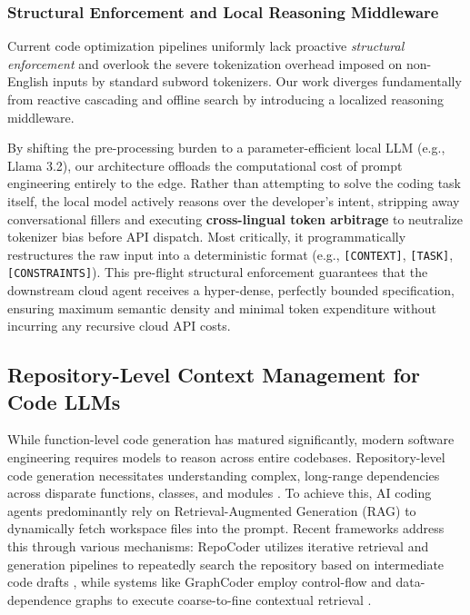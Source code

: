 \documentclass[11pt,a4paper,twocolumn]{article}
\begin{document}
\subsubsection*{Structural Enforcement and Local Reasoning Middleware}

Current code optimization pipelines uniformly lack proactive \textit{structural enforcement} and overlook the severe tokenization overhead imposed on non-English inputs by standard subword tokenizers. Our work diverges fundamentally from reactive cascading and offline search by introducing a localized reasoning middleware. 

By shifting the pre-processing burden to a parameter-efficient local LLM (e.g., Llama 3.2), our architecture offloads the computational cost of prompt engineering entirely to the edge. Rather than attempting to solve the coding task itself, the local model actively reasons over the developer's intent, stripping away conversational fillers and executing \textbf{cross-lingual token arbitrage} to neutralize tokenizer bias before API dispatch. Most critically, it programmatically restructures the raw input into a deterministic format (e.g., \texttt{[CONTEXT]}, \texttt{[TASK]}, \texttt{[CONSTRAINTS]}). This pre-flight structural enforcement guarantees that the downstream cloud agent receives a hyper-dense, perfectly bounded specification, ensuring maximum semantic density and minimal token expenditure without incurring any recursive cloud API costs.

\subsection{Repository-Level Context Management for Code LLMs}

While function-level code generation has matured significantly, modern software engineering requires models to reason across entire codebases. Repository-level code generation necessitates understanding complex, long-range dependencies across disparate functions, classes, and modules \cite{liu2024graphcoder}. To achieve this, AI coding agents predominantly rely on Retrieval-Augmented Generation (RAG) to dynamically fetch workspace files into the prompt. Recent frameworks address this through various mechanisms: RepoCoder utilizes iterative retrieval and generation pipelines to repeatedly search the repository based on intermediate code drafts \cite{zhang-etal-2023-repocoder}, while systems like GraphCoder employ control-flow and data-dependence graphs to execute coarse-to-fine contextual retrieval \cite{liu2024graphcoder}.
\end{document}
